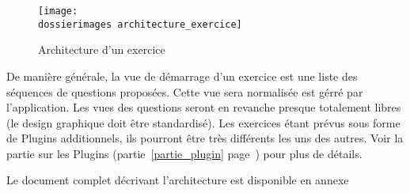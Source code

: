 \begin{figure}[htp]
	\centering
	\texttt{[image: \\dossierimages architecture\_exercice]}
	\caption{Architecture d'un exercice}
	\label{architecture_exercice}
\end{figure}

De manière générale, la vue de démarrage d’un exercice est une liste des séquences de questions proposées. Cette vue sera normalisée est gérré par l'application. Les vues des questions seront en revanche presque totalement libres (le design graphique doit être standardisé). Les exercices étant prévus sous forme de \og{}Plugins\fg{} additionnels, ils pourront \^{e}tre très différents les uns des autres. Voir la partie sur les Plugins (partie~\ref{partie_plugin} page~\pageref{partie_plugin}) pour plus de détails.

Le document complet décrivant l'architecture est disponible en annexe %